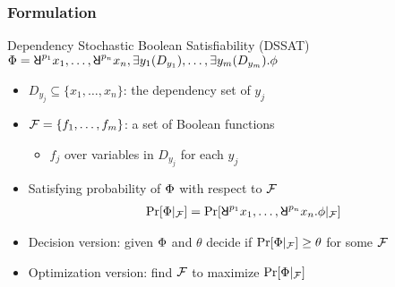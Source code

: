 \begin{frame}
  \frametitle{Formulation}
  \begin{block}{Dependency Stochastic Boolean Satisfiability (DSSAT)}
    \belowdisplayskip=0pt
    $\Qf=\random{p_1} x_1, \ldots, \random{p_n} x_n, \exists y_1(D_{y_1}), \ldots, \exists y_m(D_{y_m}).\pf$
    \pause
    \begin{itemize}
      \item $D_{y_j} \subseteq \{x_1,\ldots,x_n\}$: the \alert{dependency set} of $y_j$
            \pause
      \item $\mathcal{F}=\{f_1,\ldots,f_m\}$: a set of Boolean functions
            \pause
            \begin{itemize}
              \item $f_j$ over variables in $D_{y_j}$ for each $y_j$
            \end{itemize}
            \pause
      \item Satisfying probability of $\Phi$ with respect to $\mathcal{F}$
            \pause
            \begin{align*}
              \spb{\pcf{\Qf}{\skf}}=\Pr[\random{p_1} x_1, \ldots, \random{p_n} x_n.\pf|_{\skf}]
            \end{align*}
            \pause
      \item Decision version: given $\Phi$ and $\theta$ decide if $\Pr[\Phi|_{\mathcal{F}}] \geq \theta$ for some $\mathcal{F}$
            \pause
      \item Optimization version: find $\mathcal{F}$ to maximize $\Pr[\Phi|_{\mathcal{F}}]$
    \end{itemize}
  \end{block}
\end{frame}

